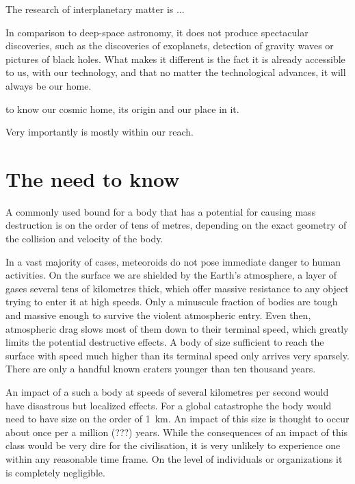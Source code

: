 
The research of interplanetary matter is ...

In comparison to deep-space astronomy, it does not produce spectacular discoveries,
such as the discoveries of exoplanets, detection of gravity waves or pictures of black holes.
What makes it different is the fact it is already accessible to us, with our technology,
and that no matter the technological advances, it will always be our home.


    to know our cosmic home, its origin and our place in it.

    Very importantly is mostly within our reach.

\section{The need to know} \label{in}


    A commonly used bound for a body that has a potential for causing mass destruction is on the order of tens of metres,
    depending on the exact geometry of the collision and velocity of the body.


In a vast majority of cases, meteoroids do not pose immediate danger to human activities.
On the surface we are shielded by the Earth's atmosphere, a layer of gases several tens of kilometres
thick, which offer massive resistance to any object trying to enter it at high speeds.
Only a minuscule fraction of bodies are tough and massive enough to survive the violent atmospheric entry.
Even then, atmospheric drag slows most of them down to their terminal speed, which greatly limits the potential destructive effects.
A body of size sufficient to reach the surface with speed much higher than its terminal speed
only arrives very sparsely. There are only a handful known craters younger than ten thousand years.


    An impact of a such a body at speeds of several kilometres per second would have disastrous but localized effects.
    For a global catastrophe the body would need to have size on the order
    of \SI{1}{\kilo\metre}. An impact of this size is thought to occur about once per a million (???) years. 
    While the consequences of an impact of this class would be very dire for the civilisation,
    it is very unlikely to experience one within any reasonable time frame.
    On the level of individuals or organizations it is completely negligible.

